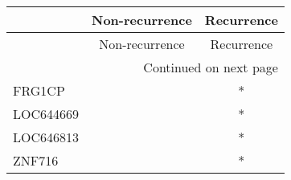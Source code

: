 \begin{longtable}{lcc}
\toprule
{} & Non-recurrence & Recurrence \\
\midrule
\endfirsthead

\toprule
{} & Non-recurrence & Recurrence \\
\midrule
\endhead
\midrule
\multicolumn{3}{r}{{Continued on next page}} \\
\midrule
\endfoot

\bottomrule
\endlastfoot
FRG1CP    &                &          * \\
LOC644669 &                &          * \\
LOC646813 &                &          * \\
ZNF716    &                &          * \\
\end{longtable}
